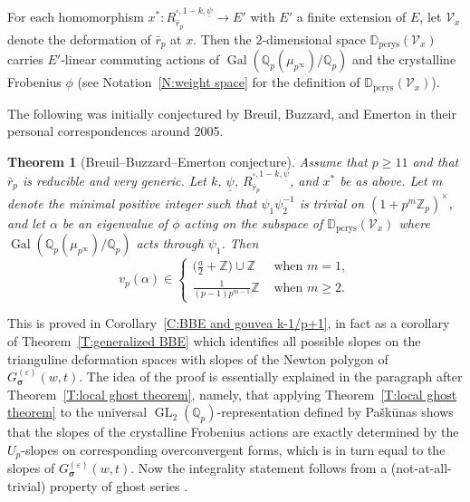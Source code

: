 \documentclass[12pt]{amsart}
\newtheorem{theorem}[subsection]{Theorem}
\theoremstyle{definition}
\numberwithin{equation}{subsection}
\def\calV{\mathcal{V}}
\def\DD{\mathbb{D}}
\def\QQ{\mathbb{Q}}
\def\ZZ{\mathbb{Z}}
\DeclareMathOperator{\Gal}{Gal}
\DeclareMathOperator{\GL}{GL}
\newcommand{\bbsigma}{\boldsymbol{\sigma}}
\newcommand{\pcrys}{\mathrm{pcrys}}
\begin{document}
For each homomorphism $x^*: R_{\bar r_p}^{\square, 1-k, \underline \psi} \to E'$ with $E'$ a finite extension of $E$, let $\calV_x$ denote the deformation of $\bar r_p$ at $x$. Then the $2$-dimensional space $\DD_\mathrm{pcrys}(\calV_x)$ carries $E'$-linear commuting actions of $\Gal(\QQ_p(\mu_{p^\infty})/\QQ_p)$ and the crystalline Frobenius $\phi$ (see Notation~\ref{N:weight space} for the definition of $\DD_\pcrys(\calV_x)$).

The following \cite[Conjecture~4.1.1]{buzzard-gee} was initially conjectured by Breuil, Buzzard, and Emerton in their personal  correspondences around 2005.
\begin{theorem}[Breuil--Buzzard--Emerton conjecture]
\label{T:BBE}
Assume that $p\geq 11$ and that $\bar r_p$ is reducible and very generic.
Let $k$, $\underline \psi$, $R_{\bar r_p}^{\square, 1-k, \underline \psi}$, and $x^*$ be as above.
Let $m$ denote the minimal \emph{positive} integer such that $\psi_1\psi_2^{-1}$ is trivial on $(1+p^m\ZZ_p)^\times$, and let
$\alpha$ be an eigenvalue of $\phi$ acting on the subspace of $\DD_\mathrm{pcrys}(\calV_x)$ where $\Gal(\QQ_p(\mu_{p^\infty})/\QQ_p)$ acts through $\psi_1$. Then
$$
v_p(\alpha) \in \begin{cases}
\big(\frac a2+\ZZ\big)\cup \ZZ & \textrm{ when }m=1,
\\ \frac{1}{(p-1)p^{m-1}} \ZZ & \textrm{ when }m \geq 2.
\end{cases}
$$
\end{theorem}


This is proved in Corollary~\ref{C:BBE and gouvea k-1/p+1}, in fact as a corollary of Theorem~\ref{T:generalized BBE} which identifies all possible slopes on the trianguline deformation spaces with slopes of the Newton polygon of $G_{\bbsigma}^{(\varepsilon)}(w,t)$.  The idea of the proof is essentially explained in the paragraph after Theorem~\ref{T:local ghost theorem}, namely, that applying Theorem~\ref{T:local ghost theorem} to the universal $\GL_2(\QQ_p)$-representation defined by Pa\v sk\=unas shows that the slopes of the crystalline Frobenius actions are exactly determined by the $U_p$-slopes on corresponding overconvergent forms, which is in turn equal to the slopes of $G_{\bbsigma}^{(\varepsilon)}(w,t)$.  Now the integrality statement follows from a (not-at-all-trivial) property of ghost series \cite[Corollaries~4.14 and 5.24]{liu-truong-xiao-zhao}.
\end{document}
